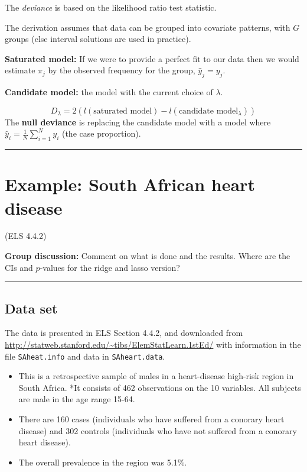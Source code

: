 \documentclass[
]{article}
\providecommand{\tightlist}{%
  \setlength{\itemsep}{0pt}\setlength{\parskip}{0pt}}
\begin{document}
The \emph{deviance} is based on the likelihood ratio test statistic.

The derivation assumes that data can be grouped into covariate patterns,
with \(G\) groups (else interval solutions are used in practice).

\textbf{Saturated model:} If we were to provide a perfect fit to our
data then we would estimate \(\pi_j\) by the observed frequency for the
group, \(\hat{y}_j=y_j\).

\textbf{Candidate model:} the model with the current choice of
\(\lambda\).

\[D_{\lambda}=2(l(\text{saturated model})-l(\text{candidate model}_{\lambda}))\]
The \textbf{null deviance} is replacing the candidate model with a model
where \(\hat{y}_i=\frac{1}{N}\sum_{i=1}^N y_i\) (the case proportion).

\begin{center}\rule{0.5\linewidth}{0.5pt}\end{center}

\hypertarget{example-south-african-heart-disease}{%
\section{Example: South African heart
disease}\label{example-south-african-heart-disease}}

(ELS 4.4.2)

\textbf{Group discussion:} Comment on what is done and the results.
Where are the CIs and \(p\)-values for the ridge and lasso version?

\begin{center}\rule{0.5\linewidth}{0.5pt}\end{center}

\hypertarget{data-set}{%
\subsection{Data set}\label{data-set}}

The data is presented in ELS Section 4.4.2, and downloaded from
\url{http://statweb.stanford.edu/~tibs/ElemStatLearn.1stEd/} with
information in the file \texttt{SAheat.info} and data in
\texttt{SAheart.data}.

\begin{itemize}
\tightlist
\item
  This is a retrospective sample of males in a heart-disease high-risk
  region in South Africa. *It consists of 462 observations on the 10
  variables. All subjects are male in the age range 15-64.
\item
  There are 160 cases (individuals who have suffered from a conorary
  heart disease) and 302 controls (individuals who have not suffered
  from a conorary heart disease).\\
\item
  The overall prevalence in the region was 5.1\%.
\end{itemize}
\end{document}
